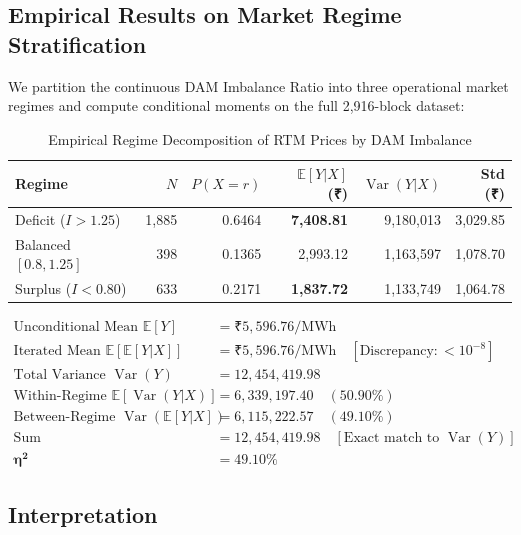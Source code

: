 \documentclass[12pt, a4paper]{article}
\theoremstyle{definition}
\newcommand{\MWh}{\text{MWh}}
\begin{document}
\subsection{Empirical Results on Market Regime Stratification}

We partition the continuous DAM Imbalance Ratio into three operational market regimes and compute conditional moments on the full 2,916-block dataset:

\begin{table}[H]
\centering
\caption{Empirical Regime Decomposition of RTM Prices by DAM Imbalance}
\label{tab:conditional}
\begin{tabular}{l r r r r r}
\toprule
\textbf{Regime} & \textbf{$N$} & \textbf{$P(X\!=\!r)$} & \textbf{$\mathbb{E}[Y|X]$ (₹)} & \textbf{$\operatorname{Var}(Y|X)$} & \textbf{Std (₹)} \\
\midrule
Deficit ($I > 1.25$) & 1,885 & 0.6464 & \textbf{7,408.81} & 9,180,013 & 3,029.85 \\
Balanced $[0.8, 1.25]$ & 398 & 0.1365 & 2,993.12 & 1,163,597 & 1,078.70 \\
Surplus ($I < 0.80$) & 633 & 0.2171 & \textbf{1,837.72} & 1,133,749 & 1,064.78 \\
\bottomrule
\end{tabular}
\end{table}

\begin{tcolorbox}[colback=lightbg, colframe=teal, title={\textbf{Eve's Law Numerical Verification}}]
\begin{align*}
\text{Unconditional Mean } \mathbb{E}[Y] &= \text{₹}5{,}596.76/\MWh \\
\text{Iterated Mean } \mathbb{E}[\mathbb{E}[Y|X]] &= \text{₹}5{,}596.76/\MWh \quad [\text{Discrepancy}: < 10^{-8}] \\[4pt]
\text{Total Variance } \operatorname{Var}(Y) &= 12{,}454{,}419.98 \\
\text{Within-Regime } \mathbb{E}[\operatorname{Var}(Y|X)] &= 6{,}339{,}197.40 \quad (50.90\%) \\
\text{Between-Regime } \operatorname{Var}(\mathbb{E}[Y|X]) &= 6{,}115{,}222.57 \quad (49.10\%) \\
\text{Sum} &= 12{,}454{,}419.98 \quad [\text{Exact match to } \operatorname{Var}(Y)] \\[4pt]
\boldsymbol{\eta^2} &= \mathbf{49.10\%}
\end{align*}
\end{tcolorbox}

\subsection{Interpretation}
\end{document}
